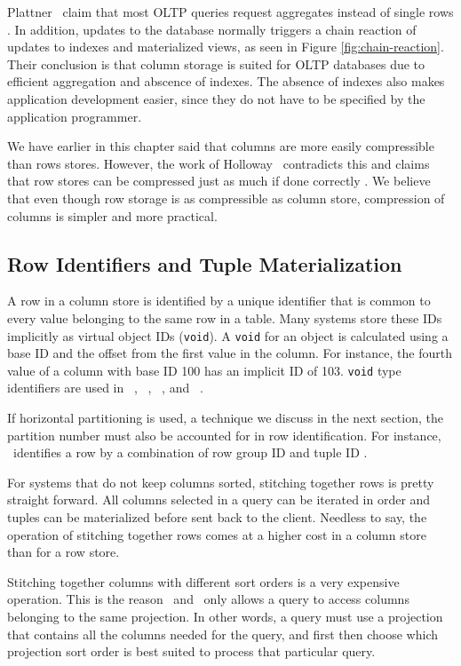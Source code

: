 Plattner \ea~claim that most OLTP queries request aggregates instead of single rows \cite{Plattner2014-fr}. In addition, updates to the database normally triggers a chain reaction of updates to indexes and materialized views, as seen in Figure \ref{fig:chain-reaction}. Their conclusion is that column storage is suited for OLTP databases due to efficient aggregation and abscence of indexes. The absence of indexes also makes application development easier, since they do not have to be specified by the application programmer.

We have earlier in this chapter said that columns are more easily compressible than rows stores. However, the work of Holloway \ea~contradicts this and claims that row stores can be compressed just as much if done correctly \cite{Holloway2008-rr}. We believe that even though row storage is as compressible as column store, compression of columns is simpler and more practical.

\subsection{Row Identifiers and Tuple Materialization}
\label{sub:Row Identifiers and Tuple Materialization}
A row in a column store is identified by a unique identifier that is common to every value belonging to the same row in a table. Many systems store these IDs implicitly as virtual object IDs (\texttt{void}). A \texttt{void} for an object is calculated using a base ID and the offset from the first value in the column. For instance, the fourth value of a column with base ID 100 has an implicit ID of 103. \texttt{void} type identifiers are used in \monetdb~\cite{Boncz2002-yj}, \cstore~\cite{Stonebraker2005-qz}, \vertica~\cite{Lamb2012-kg}, and \ibm~\cite{Raman2013-em}.

If horizontal partitioning is used, a technique we discuss in the next section, the partition number must also be accounted for in row identification. For instance, \mssql~identifies a row by a combination of row group ID and tuple ID \cite{Larson2013-mc}.

For systems that do not keep columns sorted, stitching together rows is pretty straight forward. All columns selected in a query can be iterated in order and tuples can be materialized before sent back to the client. Needless to say, the operation of stitching together rows comes at a higher cost in a column store than for a row store.

Stitching together columns with different sort orders is a very expensive operation. This is the reason \cstore~and \vertica~only allows a query to access columns belonging to the same projection. In other words, a query must use a projection that contains all the columns needed for the query, and first then choose which projection sort order is best suited to process that particular query.

